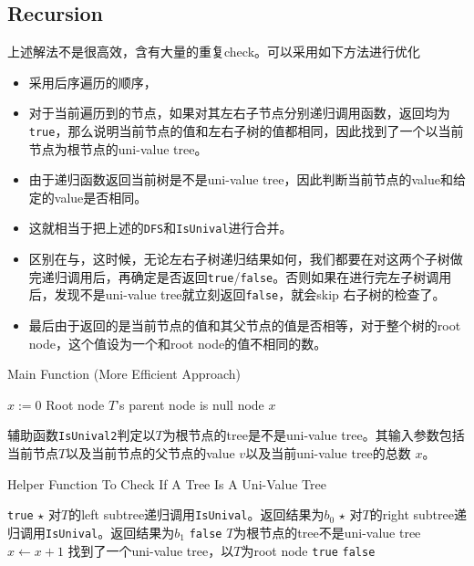 \subsection{Recursion}
上述解法不是很高效，含有大量的重复check。可以采用如下方法进行优化
\begin{itemize}
\item 采用后序遍历的顺序，
\item 对于当前遍历到的节点，如果对其左右子节点分别递归调用函数，返回均为\texttt{true}，那么说明当前节点的值和左右子树的值都相同，因此找到了一个以当前节点为根节点的uni-value tree。
\item 由于递归函数返回当前树是不是uni-value tree，因此判断当前节点的value和给定的value是否相同。
\item 这就相当于把上述的\texttt{DFS}和\texttt{IsUnival}进行合并。
\item 区别在与，这时候，无论左右子树递归结果如何，我们都要在对这两个子树做完递归调用后，再确定是否返回\texttt{true}/\texttt{false}。否则如果在进行完左子树调用后，发现不是uni-value tree就立刻返回\texttt{false}，就会skip 右子树的检查了。
\item 最后由于返回的是当前节点的值和其父节点的值是否相等，对于整个树的root node，这个值设为一个和root node的值不相同的数。
\end{itemize}
\begin{algorithm}[H]
\caption{Main Function (More Efficient Approach)}
\begin{algorithmic}[1]
\State $x:=0$
\State {} \Comment Root node $T$'s parent node is null node
\State \Return $x$
\EndProcedure
\end{algorithmic}
\end{algorithm}
辅助函数\texttt{IsUnival2}判定以$T$为根节点的tree是不是uni-value tree。其输入参数包括当前节点$T$以及当前节点的父节点的value $v$以及当前uni-value tree的总数 $x$。
\begin{algorithm}[H]
\caption{Helper Function To Check If A Tree Is A Uni-Value Tree}
\begin{algorithmic}[1]
\State \Return \texttt{true}
\EndIf
\State $\star$ 对$T$的left subtree递归调用\texttt{IsUnival}。返回结果为$b_0$
\State $\star$ 对$T$的right subtree递归调用\texttt{IsUnival}。返回结果为$b_1$
\State \Return \texttt{false} \Comment $T$为根节点的tree不是uni-value tree
\Else
\State $x\gets x+1$ \Comment 找到了一个uni-value tree，以$T$为root node
\EndIf
{}
\State \Return \texttt{true}
\Else
\State \Return \texttt{false}
\EndIf
\EndProcedure
\end{algorithmic}
\end{algorithm}
